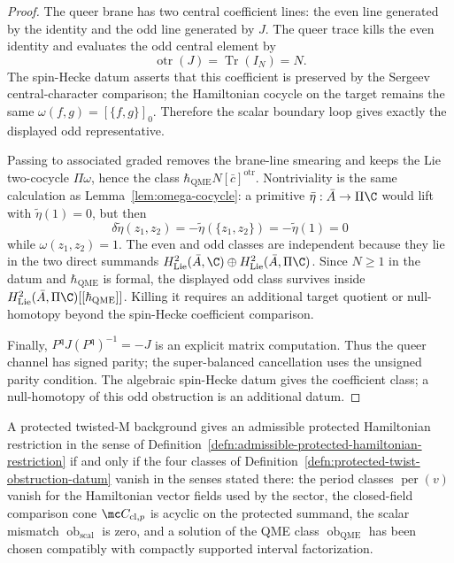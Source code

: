 \begin{proof}
  The queer brane has two central coefficient lines:
  the even line generated by the identity and the odd line generated by
  \(J\).  The queer trace kills the even identity and evaluates the odd
  central element by
  \[
    \operatorname{otr}(J)=
    \operatorname{Tr}(I_N)=N .
  \]
  The spin-Hecke datum asserts that this coefficient is preserved by the
  Sergeev central-character comparison; the Hamiltonian cocycle on the
  target remains the same \(\omega(f,g)=[\{f,g\}]_0\).  Therefore the
  scalar boundary loop gives exactly the displayed odd representative.

  Passing to associated graded removes the brane-line smearing and keeps
  the Lie two-cocycle \(\Pi\omega\), hence the class
  \(\hbar_{\mathrm{QME}} N[\bar c]^{\mathrm{otr}}\).  Nontriviality is the same
  calculation as Lemma~\ref{lem:omega-cocycle}: a primitive
  \(\bar\eta:\bar A\to\Pi\C\) would lift with
  \(\tilde\eta(1)=0\), but then
  \[
    \delta\tilde\eta(z_1,z_2)
      =-\tilde\eta(\{z_1,z_2\})
      =-\tilde\eta(1)=0
  \]
  while \(\omega(z_1,z_2)=1\).
  The even and odd classes are independent because they lie in the two
  direct summands
  \(H^2_{\mathrm{Lie}}(\bar A,\C)\oplus
  H^2_{\mathrm{Lie}}(\bar A,\Pi\C)\).
	  Since \(N\ge1\) in the datum and \(\hbar_{\mathrm{QME}}\) is formal, the displayed
	  odd class survives inside
	  \(H^2_{\mathrm{Lie}}(\bar A,\Pi\C)[[\hbar_{\mathrm{QME}}]]\).  Killing it requires an
	  additional target quotient or null-homotopy beyond the spin-Hecke
	  coefficient comparison.

  Finally,
  \(P^{\mathfrak q}J(P^{\mathfrak q})^{-1}=-J\) is an explicit matrix
  computation.  Thus the queer channel has signed parity; the
  super-balanced cancellation uses the unsigned parity condition.
  The algebraic spin-Hecke datum gives the coefficient class; a
  null-homotopy of this odd obstruction is an additional datum.
\end{proof}

\begin{lem}\label{lem:protected-primary-obstruction-test}
  A protected twisted-M background gives an admissible protected
  Hamiltonian restriction in the sense of
  Definition~\ref{defn:admissible-protected-hamiltonian-restriction}
  if and only if the four classes of
  Definition~\ref{defn:protected-twist-obstruction-datum} vanish in
  the senses stated there: the period classes
  \(\operatorname{per}(v)\) vanish for the Hamiltonian vector fields
  used by the sector, the closed-field comparison cone
  \(\mc C_{\mathrm{cl},p}\) is acyclic on the protected summand, the
  scalar mismatch \(\operatorname{ob}_{\mathrm{scal}}\) is zero, and
  a solution of the QME class \(\operatorname{ob}_{\mathrm{QME}}\) has
  been chosen compatibly with compactly supported interval
  factorization.
\end{lem}


